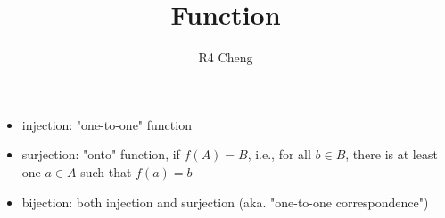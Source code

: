 \documentclass[12pt,a4paper]{article}
\title{Function}
\author{R4 Cheng}
\date{}
\begin{document}
\maketitle

\begin{itemize}
  \item injection: "one-to-one" function
  \item surjection: "onto" function, if $ f(A) = B $, i.e., for all $b \in B$, there is at least one $a \in A$ such that $f(a) = b$
  \item bijection: both injection and surjection (aka. "one-to-one correspondence")
\end{itemize}
\end{document}
